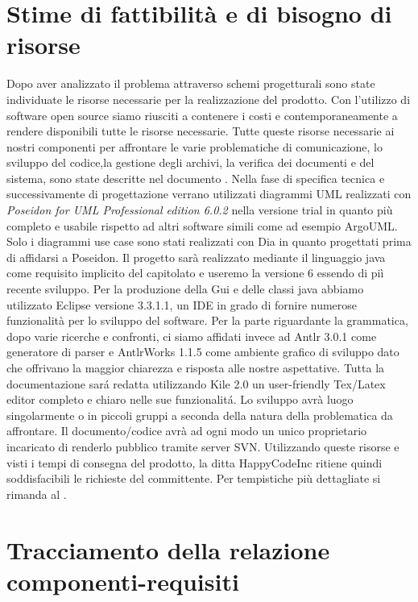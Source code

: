 \documentclass[11pt,titlepage,a4paper]{report}
\begin{document}
\chapter{Stime di fattibilit\`a e di bisogno di risorse}
Dopo aver analizzato il problema attraverso schemi progetturali sono state individuate le risorse necessarie per la realizzazione del prodotto. Con l'utilizzo di software open source siamo riusciti a contenere i costi e contemporaneamente a rendere disponibili tutte le risorse necessarie.
Tutte queste risorse necessarie ai nostri componenti per affrontare le varie problematiche di comunicazione, lo sviluppo del codice,la gestione degli archivi, la verifica dei documenti e del sistema, sono state descritte nel documento \PdQ.
Nella fase di specifica tecnica e successivamente di progettazione verrano utilizzati diagrammi UML realizzati con \textit{Poseidon for UML Professional edition 6.0.2} nella versione trial in quanto pi\`u completo e usabile rispetto ad altri software simili come ad esempio ArgoUML. Solo i diagrammi use case sono stati realizzati con Dia in quanto progettati prima di affidarsi a Poseidon.
Il progetto sar\`a realizzato mediante il linguaggio java come requisito implicito del capitolato e useremo la versione 6 essendo di pi\`i recente sviluppo.
Per la produzione della Gui e delle classi java abbiamo utilizzato Eclipse versione 3.3.1.1, un IDE in grado di fornire numerose funzionalit\`a per lo sviluppo del software.
Per la parte riguardante la grammatica, dopo varie ricerche e confronti, ci siamo affidati invece ad Antlr 3.0.1 come generatore di parser e AntlrWorks 1.1.5 come ambiente grafico di sviluppo dato che offrivano la maggior chiarezza e risposta alle nostre aspettative.
Tutta la documentazione sar\'a redatta utilizzando Kile 2.0 un user-friendly Tex/Latex editor completo e chiaro nelle sue funzionalit\'a.
Lo sviluppo avr\`a luogo singolarmente o in piccoli gruppi a seconda della natura della problematica da affrontare.
Il documento/codice avr\`a ad ogni modo un unico proprietario incaricato di renderlo pubblico tramite server SVN.
Utilizzando queste risorse e visti i tempi di consegna del prodotto, la ditta HappyCodeInc ritiene quindi soddisfacibili le richieste del committente.
Per tempistiche pi\`u dettagliate si rimanda al \PdP.

\chapter{Tracciamento della relazione componenti-requisiti}
\end{document}
